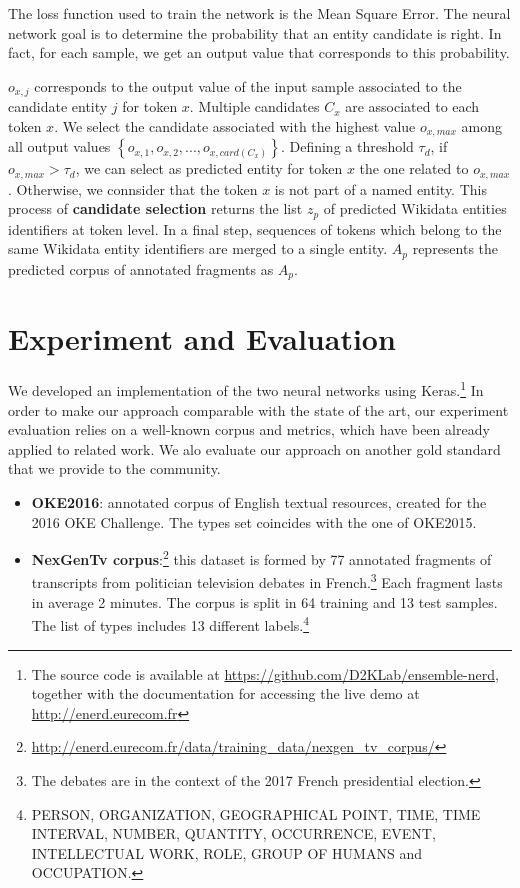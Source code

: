 \documentclass{llncs}
\begin{document}
The loss function used to train the network is the Mean Square Error. The neural network goal is to determine the probability that an entity candidate is right. In fact, for each sample, we get an output value that corresponds to this probability.

$o_{x,j}$ corresponds to the output value of the input sample associated to the candidate entity $j$ for token $x$. Multiple candidates $C_x$ are associated to each token $x$. We select the candidate associated with the highest value $o_{x,max}$ among all output values $\left \{  o_{x,1},o_{x,2},...,o_{x,card(C_x)} \right \}$. Defining a threshold $\tau_d$, if $o_{x,max} > \tau_d$, we can select as predicted entity for token $x$ the one related to $o_{x,max}$. Otherwise, we connsider that the token $x$ is not part of a named entity. This process of \textbf{candidate selection} returns the list $z_{p}$ of predicted Wikidata entities identifiers at token level. In a final step, sequences of tokens which belong to the same Wikidata entity identifiers are merged to a single entity. $A_{p}$ represents the predicted corpus of annotated fragments as $A_{p}$.


\section{Experiment and Evaluation}
\label{sec:evaluation}
We developed an implementation of the two neural networks using Keras.\footnote{The source code is available at \url{https://github.com/D2KLab/ensemble-nerd}, together with the documentation for accessing the live demo at \url{http://enerd.eurecom.fr}}
In order to make our approach comparable with the state of the art, our experiment evaluation relies on a well-known corpus and metrics, which have been already applied to related work. We alo evaluate our approach on another gold standard that we provide to the community.
\begin{itemize}
 \item \textbf{OKE2016}: annotated corpus of English textual resources, created for the 2016 OKE Challenge. The types set coincides with the one of OKE2015.
 \item \textbf{NexGenTv corpus}:\footnote{\url{http://enerd.eurecom.fr/data/training_data/nexgen_tv_corpus/}} this dataset is formed by 77 annotated fragments of transcripts from politician television debates in French.\footnote{The debates are in the context of the 2017 French presidential election.} Each fragment lasts in average 2 minutes. The corpus is split in 64 training and 13 test samples. The list of types includes 13 different labels.\footnote{PERSON, ORGANIZATION, GEOGRAPHICAL POINT, TIME, TIME INTERVAL, NUMBER, QUANTITY, OCCURRENCE, EVENT, INTELLECTUAL WORK, ROLE, GROUP OF HUMANS and OCCUPATION.} 
\end{itemize}
\end{document}
